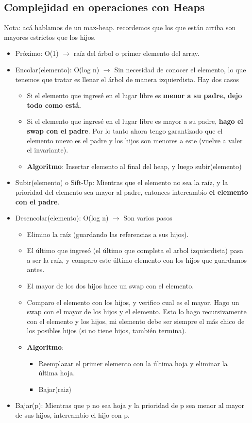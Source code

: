 \documentclass[10pt,a4paper]{article}
\begin{document}
\subsection*{Complejidad en operaciones con Heaps}
Nota: acá hablamos de un max-heap. recordemos que los que están arriba son mayores estrictos que los hijos.
\begin{itemize}
    \item Próximo: O(1) $\rightarrow$ raíz del árbol o primer elemento del array.
    \item Encolar(elemento): O(log n) $\rightarrow$ Sin necesidad de conocer el elemento, lo que tenemos que tratar es llenar el árbol de manera izquierdista. Hay dos casos
    \begin{itemize}
        \item Si el elemento que ingresé en el lugar libre es \textbf{menor a su padre, dejo todo como está.}
        \item Si el elemento que ingresé en el lugar libre es mayor a su padre, \textbf{hago el swap con el padre}. Por lo tanto ahora tengo garantizado que el elemento nuevo es el padre y los hijos son menores a este (vuelve a valer el invariante).
        \item \textbf{Algoritmo}: Insertar elemento al final del heap, y luego subir(elemento)
    \end{itemize}
    \item Subir(elemento) o Sift-Up: Mientras que el elemento no sea la raíz, y la prioridad del elemento sea mayor al padre, entonces intercambio \textbf{el elemento con el padre}.
    \item Desencolar(elemento): O(log n) $\rightarrow$ Son varios pasos 
    \begin{itemize}
        \item Elimino la raíz (guardando las referencias a sus hijos). 
        \item El último que ingresó (el último que completa el arbol izquierdista) pasa a ser la raíz, y comparo este último elemento con los hijos que guardamos antes. 
        \item El mayor de los dos hijos hace un swap con el elemento.
        \item Comparo el elemento con los hijos, y verifico cual es el mayor. Hago un swap con el mayor de los hijos y el elemento. Esto lo hago recursivamente con el elemento y los hijos, mi elemento debe ser siempre el más chico de los posibles hijos (si no tiene hijos, también termina).
        \item \textbf{Algoritmo}: \begin{itemize}
            \item Reemplazar el primer elemento con la última hoja y eliminar la última hoja.
            \item Bajar(raiz)
        \end{itemize}
    \end{itemize} 
    \item Bajar(p): Mientras que p no sea hoja y la prioridad de p sea menor al mayor de sus hijos, intercambio el hijo con p.

\end{itemize}
\end{document}
